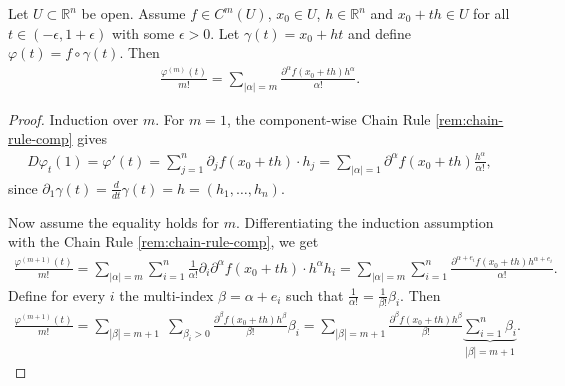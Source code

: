 \begin{lemma}
    Let $U \subset \mathbb{R}^{n}$ be open. Assume $f \in C^{m}(U)$, $x_{0} \in U$, $h \in \mathbb{R}^{n}$ and $x_{0} + th \in U$ for all $t \in (-\epsilon, 1+\epsilon)$ with some $\epsilon > 0$. Let $\gamma (t) = x_{0} + ht$ and define $\varphi(t) = f \circ \gamma (t)$. Then
    \begin{align*}
        \frac{\varphi^{(m)}(t)}{m!} = \sum_{\left| \alpha  \right| = m} \frac{\partial^{\alpha } f(x_{0}+ th) h^{\alpha }}{\alpha !}.
    \end{align*}
\end{lemma}
\begin{proof}
    Induction over $m$. For $m=1$, the component-wise Chain Rule \ref{rem:chain-rule-comp} gives
    \begin{align*}
        D\varphi_{t}(1) = \varphi'(t) = \sum_{j=1}^{n} \partial_{j} f(x_{0} + th) \cdot h_{j} = \sum_{\left| \alpha  \right| = 1} \partial^{\alpha }f(x_{0} + th) \frac{h^{\alpha }}{\alpha !},
    \end{align*}
    since $\partial_{1} \gamma (t) = \frac{d}{dt} \gamma (t) = h = (h_{1}, \dots, h_{n})$. 

    Now assume the equality holds for $m$. Differentiating the induction assumption with the Chain Rule \ref{rem:chain-rule-comp}, we get
    \begin{align*}
        \frac{\varphi^{(m+1)}(t)}{m!} = \sum_{\left| \alpha  \right| = m} \sum_{i=1}^{n} \frac{1}{\alpha !} \partial_{i}\partial^{\alpha }f(x_{0}+th) \cdot h^{\alpha }h_{i} = \sum_{\left| \alpha \right| = m} \sum_{i=1}^{n} \frac{\partial^{\alpha + e_{i} } f(x_{0} + th)h^{\alpha + e_{i}}}{\alpha !}.
    \end{align*}
    Define for every $i$ the multi-index $\beta = \alpha + e_{i}$ such that $\frac{1}{\alpha !} = \frac{1}{\beta !} \beta_{i}$. Then
    \begin{align*}
        \frac{\varphi^{(m+1)}(t)}{m!} = \sum_{\left| \beta  \right| = m+1} \; \sum_{\beta_{i} > 0} \frac{\partial^{\beta } f(x_{0}+th) h^{\beta }}{\beta !} \beta_{i}  
        = \sum_{\left| \beta  \right| = m+1} \frac{\partial^{\beta } f(x_{0}+th) h^{\beta }}{\beta !} \underbrace{\sum_{i=1}^{n} \beta_{i}}_{\left| \beta  \right| = m+1}.
    \end{align*}
\end{proof}

